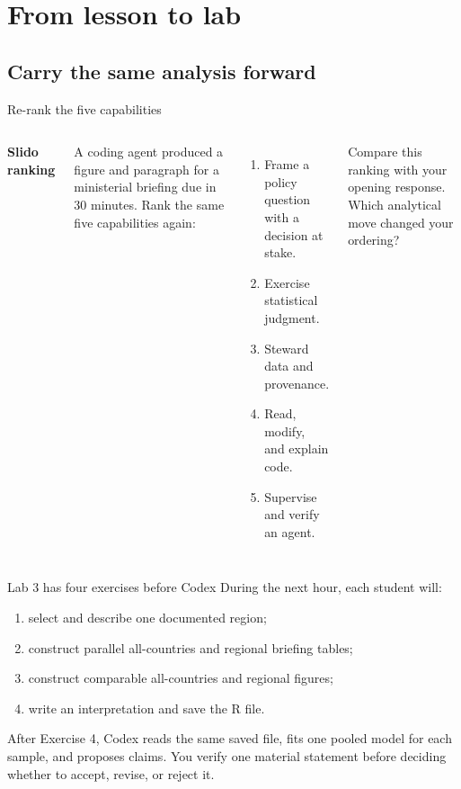 \section{From lesson to lab}
\subsection{Carry the same analysis forward}

\begin{frame}{Re-rank the five capabilities}
  \begin{columns}[T,onlytextwidth]
      \textbf{Slido ranking}

      A coding agent produced a figure and paragraph for a ministerial briefing
      due in 30 minutes. Rank the same five capabilities again:
      \begin{enumerate}
        \item Frame a policy question with a decision at stake.
        \item Exercise statistical judgment.
        \item Steward data and provenance.
        \item Read, modify, and explain code.
        \item Supervise and verify an agent.
      \end{enumerate}

      \vspace{0.35em}
      Compare this ranking with your opening response. Which analytical move
      changed your ordering?
      
  \end{columns}
\end{frame}

\begin{frame}{Lab 3 has four exercises before Codex}
  During the next hour, each student will:
  \begin{enumerate}
    \item select and describe one documented region;
    \item construct parallel all-countries and regional briefing tables;
    \item construct comparable all-countries and regional figures;
    \item write an interpretation and save the R file.
  \end{enumerate}

  \vfill
  After Exercise 4, Codex reads the same saved file, fits one pooled model for
  each sample, and proposes claims. You verify one material statement before
  deciding whether to accept, revise, or reject it.
\end{frame}


